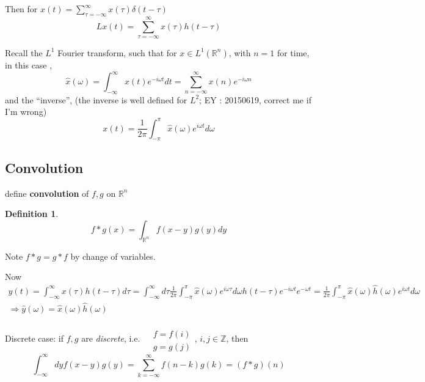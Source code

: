 \documentclass[twoside]{amsart}
\theoremstyle{plain}
\theoremstyle{definition}
\newtheorem{definition}{Definition}
\theoremstyle{remark}
\numberwithin{equation}{section}
\begin{document}
Then for $x(t) = \sum_{\tau=-\infty}^{\infty} x(\tau) \delta(t-\tau)$
\[
Lx(t) = \sum_{\tau=-\infty}^{\infty} x(\tau) h(t-\tau)
\]

Recall the $L^1$ Fourier transform, such that for $x \in L^1(\mathbb{R}^n)$, with $n=1$ for time, in this case \cite{ELiebMLoss2001},
\begin{equation}\label{Eq:FT}
  \boxed{ \widehat{x}(\omega) = \int_{-\infty}^{\infty} x(t) e^{-i\omega t} dt = \sum_{n=-\infty}^{\infty}x(n) e^{-i\omega n} }
\end{equation}
and the ``inverse'', (the inverse is well defined for $L^2$; EY : 20150619, correct me if I'm wrong)
\begin{equation}\label{Eq:iFT}
x(t)= \frac{1}{2\pi} \int_{-\pi}^{\pi} \widehat{x}(\omega) e^{i\omega t} d\omega
\end{equation}

\subsection*{Convolution}

define \textbf{convolution} of $f,g$ on $\mathbb{R}^n$
\begin{definition}
\begin{equation}  f* g(x) = \int_{ \mathbb{R}^n } f(x-y)g(y)dy \end{equation}
\end{definition}
Note $f*g = g*f$ by change of variables.  


Now
\[
\begin{gathered}
  y(t) = \int_{-\infty}^{\infty}x(\tau)h(t-\tau)d\tau = \int_{-\infty}^{\infty} d\tau \frac{1}{2\pi} \int_{-\pi}^{\pi} \widehat{x}(\omega) e^{i\omega \tau} d\omega h(t-\tau) e^{-i \omega t} e^{-\omega t} = \frac{1}{2\pi} \int_{-\pi}^{\pi} \widehat{x}(\omega) \widehat{h}(\omega) e^{i\omega t} d\omega \\ 
  \Longrightarrow \widehat{y}(\omega) = \widehat{x}(\omega) \widehat{h}(\omega)
\end{gathered}
\]

Discrete case: if $f,g$ are \emph{discrete}, i.e. $\begin{aligned} & \quad \\
  & f = f(i) \\
  & g = g(j) \end{aligned}$, $i,j \in \mathbb{Z}$, then
\[
\int_{-\infty}^{\infty} dy f(x-y)g(y) = \sum_{k=-\infty}^{\infty} f(n-k) g(k) = (f*g)(n)
\]


\end{document}
